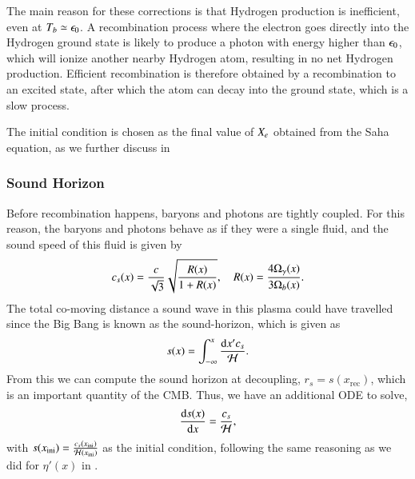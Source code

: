 The main reason for these corrections is that Hydrogen production is inefficient, even at $T_b\simeq\epsilon_0$. A recombination process where the electron goes directly into the Hydrogen ground state is likely to produce a photon with energy higher than $\epsilon_0$, which will ionize another nearby Hydrogen atom, resulting in no net Hydrogen production. Efficient recombination is therefore obtained by a recombination to an excited state, after which the atom can decay into the ground state, which is a slow process. 

The initial condition is chosen as the final value of $X_e$ obtained from the Saha equation, as we further discuss in    

\subsubsection{Sound Horizon } \label{sssec:M2:sound_horizon}
Before recombination happens, baryons and photons are tightly coupled. For this reason, the baryons and photons behave as if they were a single fluid, and the sound speed of this fluid is given by 
\begin{equation} \label{eq:M2:theory:soundspeed_R_baryons_and_photons}
    c_s(x) = \frac{c}{\sqrt{3}} \sqrt{\frac{R(x)}{1+R(x)}},\quad R(x) = \frac{4\Omega_{\gamma}(x)}{3\Omega_b(x)}.
\end{equation}
 The total co-moving distance a sound wave in this plasma could have travelled since the Big Bang is known as the sound-horizon, which is given as 
\begin{equation} \label{eq:M2:theory:sound_horizon_integral}
    s(x)=\int_{-\infty}^x \frac{\dd x' c_s}{\mathcal{H}}.
\end{equation}
From this we can compute the sound horizon at decoupling, $r_s = s(x_\mathrm{rec})$, which is an important quantity of the CMB. Thus, we have an additional ODE to solve, 
\begin{equation} \label{eq:M2:theory:sound_horizon_ODE}
    \dv{s(x)}{x} = \frac{c_s}{\mathcal{H}},
\end{equation}
with $s(x_\mathrm{ini})=\frac{c_s(x_\mathrm{ini})}{\mathcal{H}(x_\mathrm{ini})}$ as the initial condition, following the same reasoning as we did for $\eta'(x)$ in .

